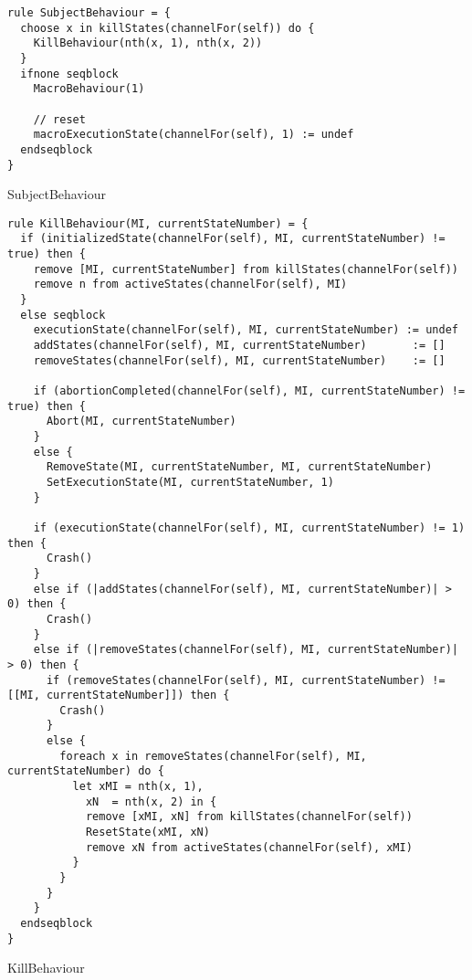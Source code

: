 \begin{listing}[H]
\begin{verbatim}
rule SubjectBehaviour = {
  choose x in killStates(channelFor(self)) do {
    KillBehaviour(nth(x, 1), nth(x, 2))
  }
  ifnone seqblock
    MacroBehaviour(1)

    // reset
    macroExecutionState(channelFor(self), 1) := undef
  endseqblock
}
\end{verbatim}
\caption{SubjectBehaviour}
\label{lst:asm:SubjectBehaviour}
\end{listing}




\begin{listing}[H]
\begin{verbatim}
rule KillBehaviour(MI, currentStateNumber) = {
  if (initializedState(channelFor(self), MI, currentStateNumber) != true) then {
    remove [MI, currentStateNumber] from killStates(channelFor(self))
    remove n from activeStates(channelFor(self), MI)
  }
  else seqblock
    executionState(channelFor(self), MI, currentStateNumber) := undef
    addStates(channelFor(self), MI, currentStateNumber)       := []
    removeStates(channelFor(self), MI, currentStateNumber)    := []

    if (abortionCompleted(channelFor(self), MI, currentStateNumber) != true) then {
      Abort(MI, currentStateNumber)
    }
    else {
      RemoveState(MI, currentStateNumber, MI, currentStateNumber)
      SetExecutionState(MI, currentStateNumber, 1)
    }

    if (executionState(channelFor(self), MI, currentStateNumber) != 1) then {
      Crash()
    }
    else if (|addStates(channelFor(self), MI, currentStateNumber)| > 0) then {
      Crash()
    }
    else if (|removeStates(channelFor(self), MI, currentStateNumber)| > 0) then {
      if (removeStates(channelFor(self), MI, currentStateNumber) != [[MI, currentStateNumber]]) then {
        Crash()
      }
      else {
        foreach x in removeStates(channelFor(self), MI, currentStateNumber) do {
          let xMI = nth(x, 1),
            xN  = nth(x, 2) in {
            remove [xMI, xN] from killStates(channelFor(self))
            ResetState(xMI, xN)
            remove xN from activeStates(channelFor(self), xMI)
          }
        }
      }
    }
  endseqblock
}
\end{verbatim}
\caption{KillBehaviour}
\label{lst:asm:KillBehaviour}
\end{listing}




